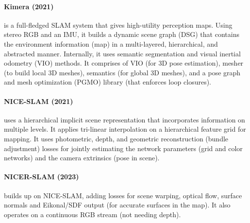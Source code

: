 \paragraph{Kimera (2021) \cite{Rosinol2021KimeraFS}} is a full-fledged
SLAM system that gives high-utility perception maps. Using stereo RGB
and an IMU, it builds a dynamic scene graph (DSG) that contains the
environment information (map) in a multi-layered, hierarchical, and
abstracted manner. Internally, it uses semantic segmentation and
visual inertial odometry (VIO) methods. It comprises of VIO (for 3D
pose estimation), mesher (to build local 3D meshes), semantics (for 
global 3D meshes), and a pose graph and mesh optimization (PGMO) 
library (that enforces loop closures).



\paragraph{NICE-SLAM (2021) \cite{Zhu2021NICESLAMNI}} uses a
hierarchical implicit scene representation that incorporates
information on multiple levels. It applies tri-linear interpolation
on a hierarchical feature grid for mapping. It uses photometric, 
depth, and geometric reconstruction (bundle adjustment) losses for
jointly estimating the network parameters (grid and color networks)
and the camera extrinsics (pose in scene).

\paragraph{NICER-SLAM (2023) \cite{Zhu2023NICERSLAMNI}} builds up on
NICE-SLAM, adding losses for scene warping, optical flow, surface 
normals and Eikonal/SDF output (for accurate surfaces in the map). It
also operates on a continuous RGB stream (not needing depth).

